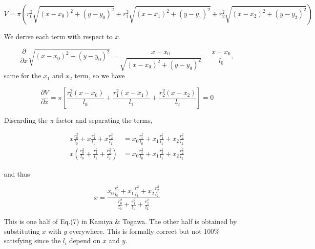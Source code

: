 \documentclass[a4paper, 11pt]{article} %
\newcommand{\sqlen}[1]{\ensuremath{(x - x_{#1})^2 + (y-y_{#1})^2}}
\newcommand{\rili}[1]{\ensuremath{\frac{r_{#1}^2}{l_{#1}}}}
\begin{document}
\begin{appendices}
\begin{equation*}
V = \pi(r_0^2 \sqrt{\sqlen{0}} + r_1^2 \sqrt{\sqlen{1}} + r_2^2 \sqrt{\sqlen{2}})
\end{equation*}

We derive each term with respect to $x$.

\begin{equation*}
\frac{\partial}{\partial x} \sqrt{\sqlen{0}} = \frac{x-x_0}{\sqrt{\sqlen{0}}} = \frac{x-x_0}{l_0},
\end{equation*}
same for the $x_1$ and $x_2$ term, so we have

\begin{equation*}
\frac{\partial V}{\partial x} = \pi\left[ \frac{r_0^2(x-x_0)}{l_0} + \frac{r_1^2(x-x_1)}{l_1} + \frac{r_2^2(x-x_2)}{l_2}\right] = 0
\end{equation*}

Discarding the $\pi$ factor and separating the terms,

\begin{align*}
x\rili{0} + x\rili{1} + x\rili{2} &= x_0\rili{0} + x_1\rili{1} + x_2\rili{2} \\
x(\rili{0} + \rili{1} + \rili{2}) &= x_0\rili{0} + x_1\rili{1} + x_2\rili{2} 
\end{align*}

and thus

\begin{equation*}
x = \frac{x_0\rili{0} + x_1\rili{1} + x_2\rili{2}}{\rili{0} + \rili{1} + \rili{2}}
\end{equation*}

This is one half of Eq.(7) in Kamiya \& Togawa. The other half is obtained by substituting $x$ with $y$ everywhere. This is
formally correct but not 100\% satisfying since the $l_i$ depend on $x$ and $y$.

\end{appendices}






\end{document}
